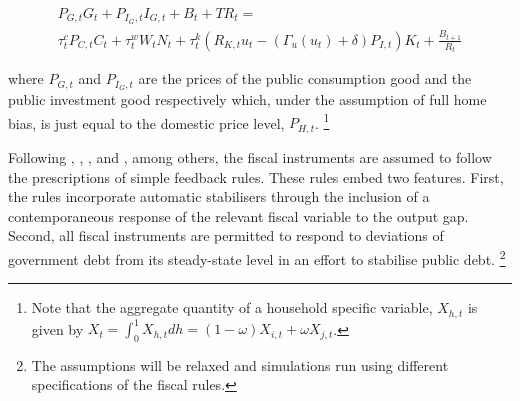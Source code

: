 \documentclass[a4paper,11pt]{article}
\numberwithin{equation}{section}
\begin{document}
	\begin{multline} \label{fisc_budget}
	P_{G,t}G_t +P_{I_G,t}I_{G,t}+B_t+TR_t = \\\tau_t^cP_{C,t}C_t +\tau_t^wW_tN_t +\tau_t^k\left(R_{K,t}u_t-\left(\Gamma_u(u_t)+\delta\right)P_{I,t}\right)K_t+\frac{B_{t+1}}{R_t}
	\end{multline}
	
	where $P_{G,t}$ and $P_{I_G,t}$ are the prices of the public consumption good and the public investment good respectively which, under the assumption of full home bias, is just equal to the domestic price level, $P_{H,t}$. \footnote{Note that the aggregate quantity of a household specific variable, $X_{h,t}$ is given by $X_t=\int_{0}^{1}X_{h,t}dh=(1-\omega)X_{i,t}+\omega X_{j,t}$.}
	
%	

	
	Following \cite{leeper2010}, \cite{coenen2012}, \cite{born2013}, and \cite{leeper2017}, among others, the fiscal instruments are assumed to follow the prescriptions of simple feedback rules. These rules embed two features. First, the rules incorporate automatic stabilisers through the inclusion of a contemporaneous response of the relevant fiscal variable to the output gap. Second, all fiscal instruments are permitted to respond to deviations of government debt from its steady-state level in an effort to stabilise public debt. \footnote{The assumptions will be relaxed and simulations run using different specifications of the fiscal rules.} 
	
\end{document}

